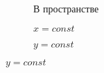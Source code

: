 \begin{figure}[H]
  \centering
  
  \begin{subfigure}[b]{0.3\textwidth}
    
    \caption{В пространстве}\label{fig:proj_3}

  \end{subfigure}
  \qquad
  \begin{subfigure}[b]{0.3\textwidth}

    
    \caption{\(x = const\)}\label{fig:proj_x}

  \end{subfigure}
  \qquad
  \begin{subfigure}[b]{0.3\textwidth}

    
    \caption{\(y = const\)}\label{fig:proj_y}

  \end{subfigure}
\end{figure}
